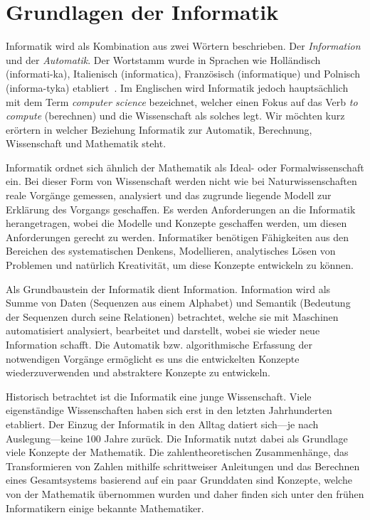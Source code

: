 \chapter{Grundlagen der Informatik}
%
Informatik wird als Kombination aus zwei Wörtern beschrieben. Der
\emph{Information} und der \emph{Automatik}. Der Wortstamm wurde in
Sprachen wie Holländisch (informati-ka), Italienisch (informatica),
Französisch (informatique) und Polnisch (informa-tyka)
etabliert~\cite[p. 21]{Balzert04}.
Im Englischen wird Informatik
jedoch hauptsächlich mit dem Term \emph{computer science} bezeichnet,
welcher einen Fokus auf das Verb \emph{to compute} (berechnen) und
die Wissenschaft als solches legt. Wir möchten kurz erörtern in
welcher Beziehung Informatik zur Automatik, Berechnung, Wissenschaft
und Mathematik steht.

Informatik ordnet sich ähnlich der Mathematik als Ideal- oder
Formalwissenschaft ein. Bei dieser Form von Wissenschaft werden nicht
wie bei Naturwissenschaften reale Vorgänge gemessen, analysiert und das
zugrunde liegende Modell zur Erklärung des Vorgangs geschaffen. Es werden
Anforderungen an die Informatik herangetragen, wobei die Modelle und
Konzepte geschaffen werden, um diesen Anforderungen gerecht zu werden.
Informatiker benötigen Fähigkeiten aus den Bereichen des systematischen
Denkens, Modellieren, analytisches Lösen von Problemen und natürlich
Kreativität, um diese Konzepte entwickeln zu können.

Als Grundbaustein der Informatik dient Information. Information
wird als Summe von Daten (Sequenzen aus einem Alphabet) und Semantik
(Bedeutung der Sequenzen durch seine Relationen) betrachtet, welche sie
mit Maschinen automatisiert analysiert, bearbeitet und darstellt, wobei
sie wieder neue Information schafft. Die Automatik bzw. algorithmische
Erfassung der notwendigen Vorgänge ermöglicht es uns die entwickelten
Konzepte wiederzuverwenden und abstraktere Konzepte zu entwickeln.

Historisch betrachtet ist die Informatik eine junge Wissenschaft. Viele
eigenständige Wissenschaften haben sich erst in den letzten Jahrhunderten
etabliert. Der Einzug der Informatik in den Alltag datiert sich---je nach
Auslegung---keine 100 Jahre zurück. Die Informatik nutzt dabei als
Grundlage viele Konzepte der Mathematik. Die zahlentheoretischen
Zusammenhänge, das Transformieren von Zahlen mithilfe schrittweiser
Anleitungen und das Berechnen eines Gesamtsystems basierend auf ein paar
Grunddaten sind Konzepte, welche von der Mathematik übernommen wurden
und daher finden sich unter den frühen Informatikern
einige bekannte Mathematiker.

